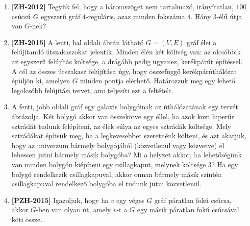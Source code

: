 \documentclass[a4paper,12pt]{article}
\begin{document}
\begin{enumerate}
        \item \textbf{[ZH-2012]} Tegyük fel, hogy a háromszöget nem tartalmazó, irányítatlan, $100$ csúcsú $G$ egyszerű gráf $4$-reguláris, azaz minden fokszáma $4$. Hány $3$-élű útja van $G$-nek?
        
        \item \textbf{[ZH-2015]} A lenti, bal oldali ábrán látható $G = (V, E)$ gráf élei a felújítandó útszakaszokat jelentik. Minden élén két költség van: az olcsóbbik az egyszerű felújítás költsége, a drágább pedig ugyanez, kerékpárút építéssel. A cél az összes útszakasz felújítása úgy, hogy összefüggő kerékpárúthálózat épüljön ki, amelyen $G$ minden pontja elérhető. Határozzuk meg egy lehető legolcsóbb felújítási tervet, ami teljesíti ezt a feltételt.
        
        \begin{figure}[h]
            \centering
            \begin{subfigure}{0.45\textwidth}
                \centering
                 \hspace{1in}
            \end{subfigure}
            \begin{subfigure}{0.45\textwidth}
                \centering
                
            \end{subfigure}
        \end{figure}
        
        \item A fenti, jobb oldali gráf egy galaxis bolygóinak az úthálózatának egy tervét ábrázolja. Két bolygó akkor van összekötve egy éllel, ha azok közt hiperűr sztrádát tudunk felépíteni, az élek súlya az egyes sztrádák költsége. Mely sztrádákat építsük meg, ha a legkevesebbet szeretnénk költeni, és azt akarjuk, hogy az univerzum bármely bolygójából (közvetlenül vagy közvetve) el lehessen jutni bármely másik bolygóba? Mi a helyzet akkor, ha lehetőségünk van minden bolygón kiépíteni egy csillagkaput, melynek költsége $3$? Ha egy bolygó rendelkezik csillagkapuval, akkor onnan bármely másik szintén csillagkapuval rendelkező bolygóba el tudunk jutni közvetlenül.

        \item \textbf{[PZH-2015]} Igazoljuk, hogy ha $v$ egy véges $G$ gráf páratlan fokú csúcsa, akkor $G$-ben van olyan út, amely $v$-t a $G$ egy másik páratlan fokú csúcsával köti össze.
        

\end{enumerate}
\end{document}
